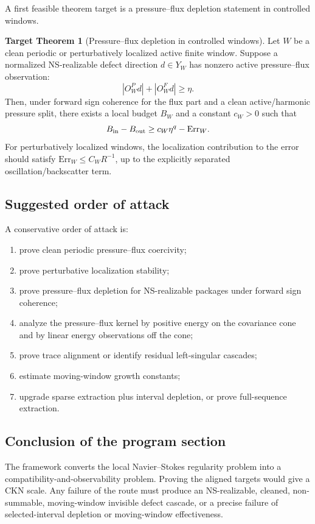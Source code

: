 \documentclass[11pt]{article}
\numberwithin{equation}{section}
\theoremstyle{plain}
\theoremstyle{definition}
\newtheorem{target}[theorem]{Target Theorem}
\theoremstyle{remark}
\newcommand{\Err}{\mathrm{Err}}
\begin{document}
A first feasible theorem target is a pressure--flux depletion statement in
controlled windows.

\begin{target}[Pressure--flux depletion in controlled windows]
\label{thm:first-feasible-pf-depletion}
Let \(W\) be a clean periodic or perturbatively localized active finite window.
Suppose a normalized NS-realizable defect direction \(d\in Y_W\) has nonzero
active pressure--flux observation:
\[
        |O_W^P d|+|O_W^F d|\ge\eta.
\]
Then, under forward sign coherence for the flux part and a clean active/harmonic pressure split, there exists a local budget \(B_W\) and a constant \(c_W>0\) such
that
\[
        B_{\rm in}-B_{\rm out}\ge c_W\eta^q-\Err_W.
\]
For perturbatively localized windows, the localization contribution to the
error should satisfy \(\Err_W\le C_W R^{-1}\), up to the explicitly separated
oscillation/backscatter term.
\end{target}

\subsection{Suggested order of attack}

A conservative order of attack is:
\begin{enumerate}
\item prove clean periodic pressure--flux coercivity;
\item prove perturbative localization stability;
\item prove pressure--flux depletion for NS-realizable packages under forward
sign coherence;
\item analyze the pressure--flux kernel by positive energy on the covariance
cone and by linear energy observations off the cone;
\item prove trace alignment or identify residual left-singular cascades;
\item estimate moving-window growth constants;
\item upgrade sparse extraction plus interval depletion, or prove full-sequence
extraction.
\end{enumerate}

\subsection{Conclusion of the program section}

The framework converts the local Navier--Stokes regularity problem into a
compatibility-and-observability problem.  Proving the aligned targets would give
a CKN scale.  Any failure of the route must produce an NS-realizable, cleaned,
non-summable, moving-window invisible defect cascade, or a precise failure of
selected-interval depletion or moving-window effectiveness.
\end{document}
